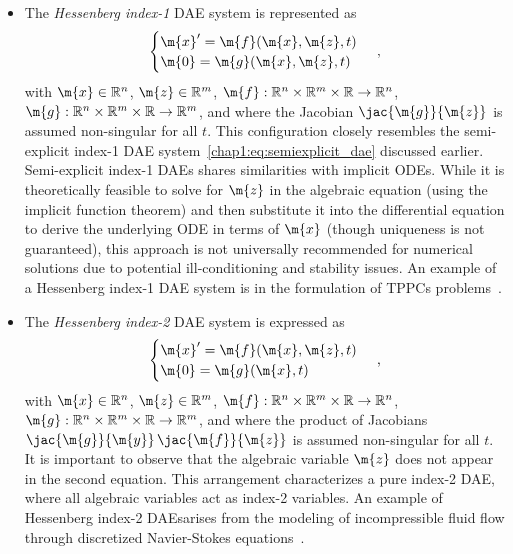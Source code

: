 \begin{itemize}
  \setlength\itemsep{0.0em}
  \item The \emph{Hessenberg index-1} \ac{DAE} system is represented as
  \begin{equation*}
    \begin{cases}
      \m{x}^{\prime} = \m{f}(\m{x}, \m{z}, t) \\
      \m{0} = \m{g}(\m{x}, \m{z}, t)
    \end{cases} \, \text{,}
  \end{equation*}
  with $\m{x} \in \mathbb{R}^n$, $\m{z} \in \mathbb{R}^m$, $\m{f}: \mathbb{R}^{n} \times \mathbb{R}^{m} \times \mathbb{R} \rightarrow \mathbb{R}^{n}$, $\m{g}: \mathbb{R}^{n} \times \mathbb{R}^{m} \times \mathbb{R} \rightarrow \mathbb{R}^{m}$, and where the Jacobian $\jac{\m{g}}{\m{z}}$ is assumed non-singular for all $t$. This configuration closely resembles the semi-explicit index-1 \ac{DAE} system~\eqref{chap1:eq:semiexplicit_dae} discussed earlier. Semi-explicit index-1 \acp{DAE} shares similarities with implicit \acp{ODE}. While it is theoretically feasible to solve for $\m{z}$ in the algebraic equation (using the implicit function theorem) and then substitute it into the differential equation to derive the underlying \ac{ODE} in terms of $\m{x}$ (though uniqueness is not guaranteed), this approach is not universally recommended for numerical solutions due to potential ill-conditioning and stability issues. An example of a Hessenberg index-1 \ac{DAE} system is in the formulation of \acp{TPPC} problems~\cite{brenan1995numerical}.
  \item The \emph{Hessenberg index-2} \ac{DAE} system is expressed as
  \begin{equation*}
    \begin{cases}
      \m{x}^{\prime} = \m{f}(\m{x}, \m{z}, t) \\
      \m{0} = \m{g}(\m{x}, t)
    \end{cases} \, \text{,}
  \end{equation*}
  with $\m{x} \in \mathbb{R}^n$, $\m{z} \in \mathbb{R}^m$, $\m{f}: \mathbb{R}^{n} \times \mathbb{R}^{m} \times \mathbb{R} \rightarrow \mathbb{R}^{n}$, $\m{g}: \mathbb{R}^{n} \times \mathbb{R}^{m} \times \mathbb{R} \rightarrow \mathbb{R}^{m}$, and where the product of Jacobians $\jac{\m{g}}{\m{y}} \, \jac{\m{f}}{\m{z}}$ is assumed non-singular for all $t$. It is important to observe that the algebraic variable $\m{z}$ does not appear in the second equation. This arrangement characterizes a pure index-2 \ac{DAE}, where all algebraic variables act as index-2 variables. An example of Hessenberg index-2 \acp{DAE}arises from the modeling of incompressible fluid flow through discretized Navier-Stokes equations~\cite{ascher1998computer}.

\end{itemize}
